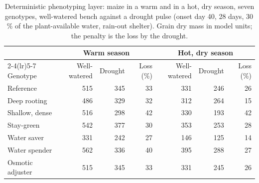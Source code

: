 \begin{table}[H]\centering\small
\caption{Deterministic phenotyping layer: maize in a warm and in a hot, dry season, seven genotypes, well-watered bench against a drought pulse (onset day 40, 28 days, 30\,\% of the plant-available water, rain-out shelter). Grain dry mass in model units; the penalty is the loss by the drought.}\label{tab:pheno}
\begin{tabular}{lrrrrrr}\toprule
 & \multicolumn{3}{c}{Warm season} & \multicolumn{3}{c}{Hot, dry season}\\\cmidrule(lr){2-4}\cmidrule(lr){5-7}
Genotype & Well-watered & Drought & Loss (\%) & Well-watered & Drought & Loss (\%)\\\midrule
Reference & 515 & 345 & 33 & 331 & 246 & 26\\
Deep rooting & 486 & 329 & 32 & 312 & 264 & 15\\
Shallow, dense & 516 & 298 & 42 & 330 & 193 & 42\\
Stay-green & 542 & 377 & 30 & 353 & 253 & 28\\
Water saver & 331 & 242 & 27 & 146 & 125 & 14\\
Water spender & 562 & 336 & 40 & 395 & 288 & 27\\
Osmotic adjuster & 515 & 345 & 33 & 331 & 245 & 26\\
\bottomrule\end{tabular}\end{table}